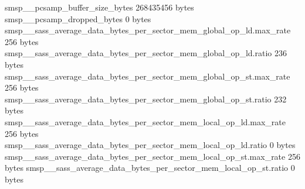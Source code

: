 smsp__pcsamp_buffer_size_bytes                                                         268435456 bytes
smsp__pcsamp_dropped_bytes                                                                     0 bytes
smsp__sass_average_data_bytes_per_sector_mem_global_op_ld.max_rate                           256 bytes
smsp__sass_average_data_bytes_per_sector_mem_global_op_ld.ratio                              236 bytes
smsp__sass_average_data_bytes_per_sector_mem_global_op_st.max_rate                           256 bytes
smsp__sass_average_data_bytes_per_sector_mem_global_op_st.ratio                              232 bytes
smsp__sass_average_data_bytes_per_sector_mem_local_op_ld.max_rate                            256 bytes
smsp__sass_average_data_bytes_per_sector_mem_local_op_ld.ratio                                 0 bytes
smsp__sass_average_data_bytes_per_sector_mem_local_op_st.max_rate                            256 bytes
smsp__sass_average_data_bytes_per_sector_mem_local_op_st.ratio                                 0 bytes

